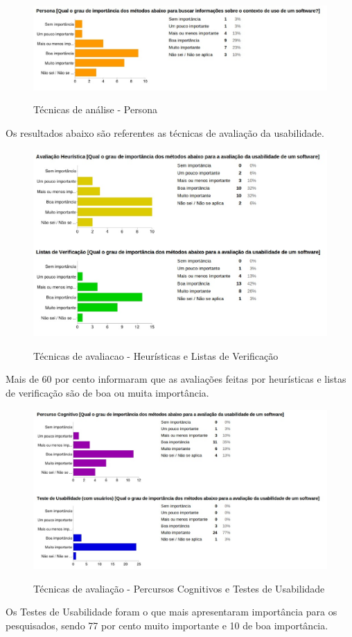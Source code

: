 	\begin{figure}[!h]
    	\centering
    	\includegraphics[keepaspectratio=true,scale=0.55]
      		{figuras/analise6.eps}
    	\label{check04}
		\caption{Técnicas de análise - Persona}
	\end{figure}

	Os resultados abaixo são referentes as técnicas de avaliação da usabilidade.	
	
	\begin{figure}[!h]
    	\centering
    	\includegraphics[keepaspectratio=true,scale=0.55]
      		{figuras/avalia1.eps}
    	\label{check04}
		\caption{Técnicas de avaliacao - Heurísticas e Listas de Verificação}
	\end{figure}
		
		Mais de 60 por cento informaram que as avaliações feitas por heurísticas e listas de verificação são de boa ou muita importância.
	\begin{figure}[!h]
    	\centering
    	\includegraphics[keepaspectratio=true,scale=0.55]
      		{figuras/avalia2.eps}
    	\label{check04}
		\caption{Técnicas de avaliação - Percursos Cognitivos e Testes de Usabilidade}
	\end{figure}

		Os Testes de Usabilidade foram o que mais apresentaram importância para os pesquisados, sendo 77 por cento muito importante e 10 de boa importância.	
